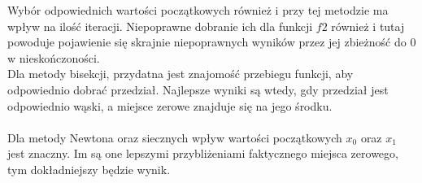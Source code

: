 \documentclass[15pt, a4paper]{article}
\begin{document}
\noindent Wybór odpowiednich wartości początkowych również i przy tej metodzie ma wpływ na ilość iteracji. Niepoprawne dobranie ich dla funkcji \(f2\) również i tutaj powoduje pojawienie się skrajnie niepoprawnych wyników przez jej zbieżność do 0 w nieskończoności.\\ 


\noindent Dla metody bisekcji, przydatna jest znajomość przebiegu funkcji, aby odpowiednio dobrać przedział. Najlepsze wyniki są wtedy, gdy przedział jest odpowiednio wąski, a miejsce zerowe znajduje się na jego środku. \\\\
Dla metody Newtona oraz siecznych wpływ wartości początkowych \(x_0\) oraz \(x_1\) jest znaczny. Im są one lepszymi przybliżeniami faktycznego miejsca zerowego, tym dokładniejszy będzie wynik. 
\end{document}
